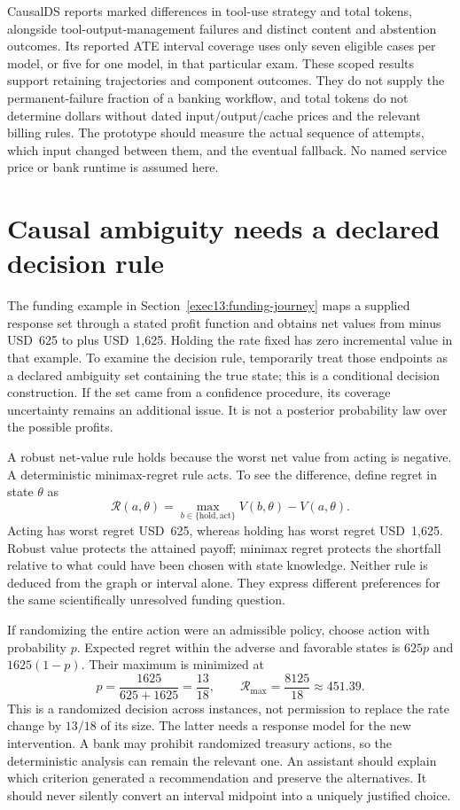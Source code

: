 CausalDS reports marked differences in tool-use strategy and total tokens,
alongside tool-output-management failures and distinct content and abstention
outcomes. Its reported ATE interval coverage uses only seven eligible cases
per model, or five for one model, in that particular exam. These scoped results
support retaining trajectories and component outcomes. They do not supply the
permanent-failure fraction of a banking workflow, and total tokens do not
determine dollars without dated input/output/cache prices and the relevant
billing rules. The prototype should measure the actual sequence of attempts,
which input changed between them, and the eventual fallback. No named service
price or bank runtime is assumed here. \citep{v12_la_2607_08093}

\section{Causal ambiguity needs a declared decision rule}
\label{exec14:l8-ambiguity}

The funding example in Section~\ref{exec13:funding-journey} maps a supplied
response set through a stated profit function and obtains net values from
minus USD~625 to plus USD~1,625. Holding the rate fixed has zero incremental
value in that example. To examine the decision rule, temporarily treat those
endpoints as a declared ambiguity set containing the true state; this is a
conditional decision construction. If the set came from a confidence procedure,
its coverage uncertainty remains an additional issue. It is not a posterior
probability law over the possible profits.

A robust net-value rule holds because the worst net value from acting is
negative. A deterministic minimax-regret rule acts. To see the difference,
define regret in state $\theta$ as
\[
 \mathcal R(a,\theta)=\max_{b\in\{\mathrm{hold},\mathrm{act}\}}
          V(b,\theta)-V(a,\theta).
\]
Acting has worst regret USD~625, whereas holding has worst regret USD~1,625.
Robust value protects the attained payoff; minimax regret protects the shortfall
relative to what could have been chosen with state knowledge. Neither rule is
deduced from the graph or interval alone. They express different preferences
for the same scientifically unresolved funding question.

If randomizing the entire action were an admissible policy, choose action with
probability $p$. Expected regret within the adverse and favorable states is
$625p$ and $1625(1-p)$. Their maximum is minimized at
\[
 p=\frac{1625}{625+1625}=\frac{13}{18},
 \qquad \mathcal R_{\max}=\frac{8125}{18}\approx451.39.
\]
This is a randomized decision across instances, not permission to replace the
rate change by $13/18$ of its size. The latter needs a response model for the
new intervention. A bank may prohibit randomized treasury actions, so the
deterministic analysis can remain the relevant one. An assistant should explain
which criterion generated a recommendation and preserve the alternatives.
It should never silently convert an interval midpoint into a uniquely justified
choice. \citep{exec14_l8_economics,exec13_funding_exact}

